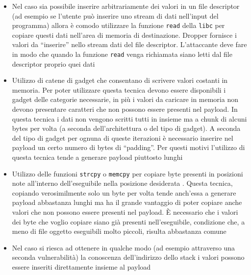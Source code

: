 \begin{itemize}

\item Nel caso sia possibile inserire arbitrariamente dei valori in un
  file descriptor (ad esempio se l'utente può inserire uno stream di
  dati nell'input del programma) allora è comodo utilizzare la
  funzione \lstinline{read} della \lstinline{libc} per copiare questi
  dati nell'area di memoria di destinazione. Dropper fornisce i valori
  da ``inserire'' nello stream dati del file descriptor. L'attaccante
  deve fare in modo che quando la funzione \lstinline{read} venga
  richiamata siano letti dal file descriptor proprio quei dati

\item Utilizzo di catene di gadget che consentano di scrivere valori
  costanti in memoria. Per poter utilizzare questa tecnica devono
  essere disponibili i gadget delle categorie necessarie, in più i
  valori da caricare in memoria non devono presentare caratteri che
  non possono essere presenti nel payload. In questa tecnica i dati
  non vengono scritti tutti in insieme ma a chunk di alcuni bytes per
  volta (a seconda dell'architettura o del tipo di gadget). A seconda
  del tipo di gadget per ognuna di queste iterazioni è necessario
  inserire nel payload un certo numero di bytes di ``padding''. Per
  questi motivi l'utilizzo di questa tecnica tende a generare payload
  piuttosto lunghi

\item Utilizzo delle funzioni \lstinline{strcpy} o \lstinline{memcpy}
  per copiare byte presenti in posizioni note all'interno
  dell'eseguibile nella posizione desiderata \cite{longld:2010}.
  Questa tecnica, copiando verosimilmente solo un byte per volta tende
  anch'essa a generare payload abbastanza lunghi ma ha il grande
  vantaggio di poter copiare anche valori che non possono essere
  presenti nel payload. È necessario che i valori dei byte che voglio
  copiare siano già presenti nell'eseguibile, condizione che, a meno
  di file oggetto eseguibili molto piccoli, risulta abbastanza comune

\item Nel caso si riesca ad ottenere in qualche modo (ad esempio
  attraverso una seconda vulnerabilità) la conoscenza dell'indirizzo
  dello stack i valori possono essere inseriti direttamente insieme al
  payload

\end{itemize}

